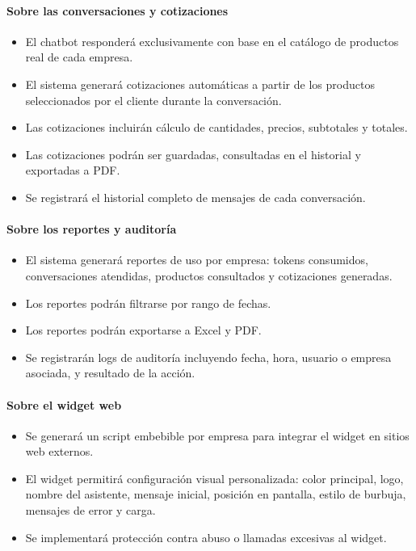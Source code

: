 \paragraph{Sobre las conversaciones y cotizaciones}
\begin{itemize}
    \item El chatbot responderá exclusivamente con base en el catálogo de productos real de cada empresa.
    \item El sistema generará cotizaciones automáticas a partir de los productos seleccionados por el cliente durante la conversación.
    \item Las cotizaciones incluirán cálculo de cantidades, precios, subtotales y totales.
    \item Las cotizaciones podrán ser guardadas, consultadas en el historial y exportadas a PDF.
    \item Se registrará el historial completo de mensajes de cada conversación.
\end{itemize}
\paragraph{Sobre los reportes y auditoría}
\begin{itemize}
    \item El sistema generará reportes de uso por empresa: tokens consumidos, conversaciones atendidas, productos consultados y cotizaciones generadas.
    \item Los reportes podrán filtrarse por rango de fechas.
    \item Los reportes podrán exportarse a Excel y PDF.
    \item Se registrarán logs de auditoría incluyendo fecha, hora, usuario o empresa asociada, y resultado de la acción.
\end{itemize}
\paragraph{Sobre el widget web}
\begin{itemize}
    \item Se generará un script embebible por empresa para integrar el widget en sitios web externos.   
    \item El widget permitirá configuración visual personalizada: color principal, logo, nombre del asistente, mensaje inicial, posición en pantalla, estilo de burbuja, mensajes de error y carga.
    \item Se implementará protección contra abuso o llamadas excesivas al widget.
\end{itemize}
